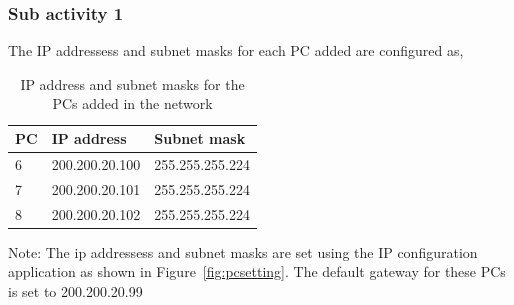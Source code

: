 \documentclass{lab_sheet}
\newcommand{\setting}[2]{
    \begin{tabular}{C{3cm}C{5cm}C{5cm}}
        \toprule
          #1 & IP address & Subnet mask\\
          \midrule
          #2
          \bottomrule
       \end{tabular}
}
\begin{document}
    \subsubsection*{Sub activity 1}
    The IP addressess and subnet masks for each PC added are configured as,
    \begin{table}[H]
        \centering
        \begin{threeparttable}
        \setting{PC}{
        6 & 200.200.20.100  & 255.255.255.224 \\
        7 & 200.200.20.101  & 255.255.255.224 \\
        8 & 200.200.20.102  & 255.255.255.224 \\
       }
  \begin{tablenotes}
    \small
    \item Note: The ip addressess and subnet masks are set using the IP configuration application as shown in Figure~\ref{fig:pcsetting}. The default gateway for these PCs is set to 200.200.20.99
  \end{tablenotes}
  \caption{IP address and subnet masks for the PCs added in the network}
  \label{tbl:pcsettingc}
        \end{threeparttable}
    \end{table}
\end{document}

